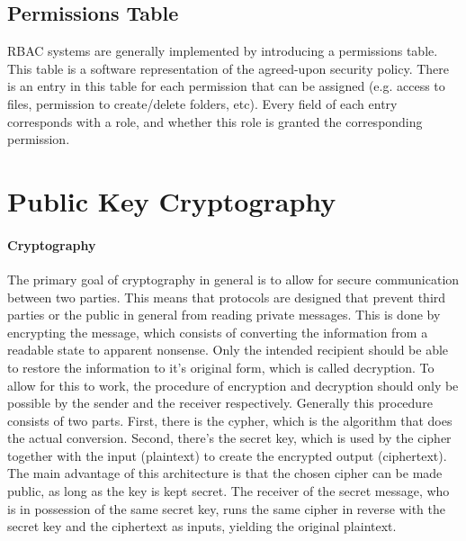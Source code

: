 \subsection{Permissions Table}
\label{subsec:permissions_table}

RBAC systems are generally implemented by introducing a permissions table. This table is a software representation of the agreed-upon security policy. There is an entry in this table for each permission that can be assigned (e.g. access to files, permission to create/delete folders, etc). Every field of each entry corresponds with a role, and whether this role is granted the corresponding permission. 


\section{Public Key Cryptography}
\label{sec:PKC}

\paragraph{Cryptography} The primary goal of cryptography in general is to allow for secure communication between two parties. This means that protocols are designed that prevent third parties or the public in general from reading private messages. This is done by encrypting the message, which consists of converting the information from a readable state to apparent nonsense. Only the intended recipient should be able to restore the information to it's original form, which is called decryption. To allow for this to work, the procedure of encryption and decryption should only be possible by the sender and the receiver respectively. Generally this procedure consists of two parts. First, there is the cypher, which is the algorithm that does the actual conversion. Second, there's the secret key, which is used by the cipher together with the input (plaintext) to create the encrypted output (ciphertext). The main advantage of this architecture is that the chosen cipher can be made public, as long as the key is kept secret. The receiver of the secret message, who is in possession of the same secret key, runs the same cipher in reverse with the secret key and the ciphertext as inputs, yielding the original plaintext.\cite{wiki:Cryptography}

